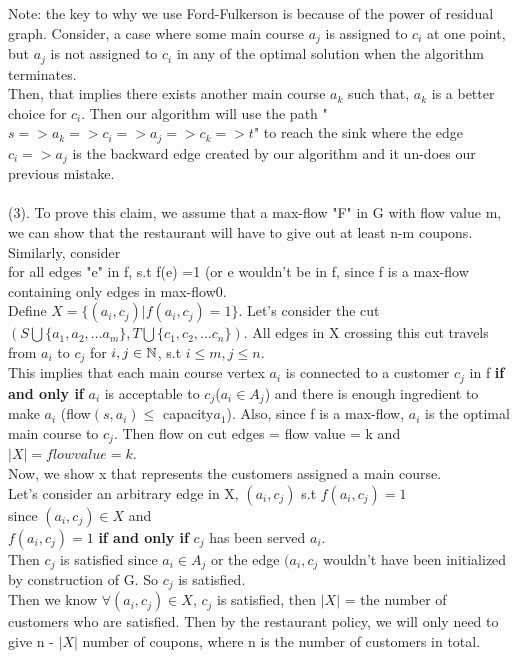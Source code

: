 \documentclass{assignment-373}
\begin{document}
\begin{enumerate}
    Note: the key to why we use Ford-Fulkerson is because of the power of residual graph. Consider, a case where some main course $a_j$ is assigned to $c_i$ at one point, but $a_j$ is not assigned to $c_i$ in any of the optimal solution when the algorithm terminates.\\
    \phantom{=} \phantom{=} Then, that implies there exists another main course $a_k$ such that, $a_k$ is a better choice for $c_i$. Then our algorithm will use the path "$s=>a_k=>c_i=>a_j=>c_k=>t$" to reach the sink where the edge $c_i=>a_j$ is the backward edge created by our algorithm and it un-does our previous mistake.\\
    \\
    (3). To prove this claim, we assume that a max-flow "F" in G with flow value m, we can show that the restaurant will have to give out at least n-m coupons.\\
    \phantom{=} \phantom{=} Similarly, consider\\
    \phantom{=} \phantom{=} for all edges "e" in f, s.t f(e) =1 (or e wouldn't be in f, since f is a max-flow containing only edges in max-flow0.\\ 
    \phantom{=} \phantom{=} Define $X = \{(a_i,c_j)|f(a_i, c_j) =1 \}$. Let's consider the cut $(S \bigcup \{a_1, a_2, ... a_m\}, T \bigcup \{c_1, c_2, ... c_n\})$. All edges in X crossing this cut travels from $a_i$ to $c_j$ for $i, j \in \mathbb N$, s.t $i \leq m, j \leq n$.\\
    \phantom{=} \phantom{=} This implies that each main course vertex $a_i$ is connected to a customer $c_j$ in f \textbf{if and only if} $a_i$ is acceptable to $c_j$($a_i \in A_j$) and there is enough ingredient to make $a_i$ (flow$(s, a_i) \leq$ capacity$a_1$). Also, since f is a max-flow, $a_i$ is the optimal main course to $c_j$. Then flow on cut edges = flow value = k and $|X| = flow value = k$.\\ 
    \phantom{=} \phantom{=}Now, we show x that represents the customers assigned a main course.\\
    \phantom{=} \phantom{=}Let's consider an arbitrary edge in X, $(a_i, c_j)$ s.t $f(a_i, c_j) =1$\\
    \phantom{=} \phantom{=}\phantom{=} since $(a_i, c_j) \in X$ and\\
    \phantom{=} \phantom{=}\phantom{=} $f(a_i, c_j) = 1$ \textbf{if and only if} $c_j$ has been served $a_i$.\\
    \phantom{=} \phantom{=}Then $c_j$ is satisfied since $a_i \in A_j$ or the edge $(a_i, c_j$ wouldn't have been initialized by construction of G. So $c_j$ is satisfied.\\
    \phantom{=} \phantom{=}Then we know $\forall(a_i, c_j) \in X$, $c_j$ is satisfied, then $|X|$ = the number of customers who are satisfied. Then by the restaurant policy, we will only need to give n - $|X|  $ number of coupons, where n is the number of customers in total. \\
    

\end{enumerate}
\end{document}
